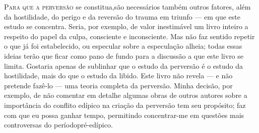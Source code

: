 \textsc{Para que a perversão} se constitua,\idxhost[|(] são necessários também outros
fatores, além da hostilidade, do perigo e da reversão do trauma em
triunfo --- em que este estudo se concentra. Seria, por exemplo, de
valor inestimável um livro inteiro a respeito do papel da culpa,\idxculpa{}
consciente e inconsciente. Mas não faz sentido repetir o que já foi
estabelecido, ou especular sobre a especulação alheia; todas essas
ideias terão que ficar como pano de fundo para a discussão a que este
livro se limita. Gostaria apenas de sublinhar que o estudo da perversão
é o estudo da hostilidade, mais do que o estudo da libido. Este livro
não revela --- e não pretende fazê-lo --- uma teoria completa da
perversão. Minha decisão, por exemplo, de não comentar em detalhe
algumas obras de outros autores sobre a importância do conflito\idxconfe{} edípico
na criação da perversão tem seu propósito; faz com que eu possa ganhar
tempo, permitindo concentrar-me em questões mais controversas do
período\idxpreedi[|(] pré-edípico.\idxconfedese{}

